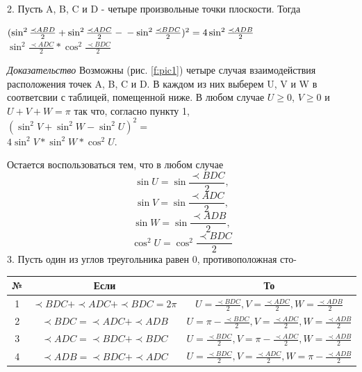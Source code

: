 \newpage

\begin{multicols}{2}
\setcounter{page}{19}
\setcounter{figure}{7}    
\captionsetup{font=footnotesize,
  justification=raggedright,
  singlelinecheck=false,
  labelfont=it}

2. Пусть A, B, C и D - четыре произвольные точки плоскости. Тогда

$(\sin^2{\frac{\prec ABD}{2}} + \sin^2{\frac{\prec ADC}{2}} -\\ - \sin^2{\frac{\prec BDC}{2}})^2 = 4\sin^2{\frac{\prec ADB}{2}}$
\times \\\-\hspace{2cm} \times$\sin^2{\frac{\prec ADC}{2}*\cos^2{\frac{\prec BDC}{2}}}$


\textit{Доказательство}  Возможны (рис. \ref{f:pic1})
четыре случая взаимодействия расположения точек A, B, C и D. В каждом из них выберем U, V и W в соответсвии с таблицей, помещенной ниже. В любом случае $U\geqslant0$, $V\geqslant0$ и $U+V+W=\pi$ так что, согласно пункту 1, \\
$(\sin^2{V}+\sin^2{W}-\sin^2{U})^2=$\\
\-\hspace{2cm}$4\sin^2{V}*\sin^2{W}*\cos^2{U}.$
 
Остается воспользоваться тем, что в любом случае\\
$$\sin{U}=\sin{\frac{\prec BDC}{2}},$$
$$\sin{V}=\sin{\frac{\prec ADC}{2}},$$
$$\sin{W}=\sin{\frac{\prec ADB}{2}},$$
$$\cos^2{U}=\cos^2{\frac{\prec BDC}{2}}$$
3. Пусть один из углов треугольника равен 0, противоположная сто-

\vspace*{5mm}

\begin{bottom*}
  \centering
  \renewcommand{\arraystretch}{2}
  \begin{tabular}{|c|c|c|}
  \hline
  № & Если & То\\ 
  \hline 
    1 & $\prec BDC+\prec ADC+\prec BDC=2\pi$ & $U=\frac{\prec BDC}{2}, V=\frac{\prec ADC}{2}, W=\frac{\prec ADB}{2}$ \\ 
    \hline
    2 & $\prec BDC=\prec ADC+\prec ADB$ & $U=\pi-\frac{\prec BDC}{2}, V=\frac{\prec ADC}{2}, W=\frac{\prec ADB}{2}$\\
    \hline
    3 & $\prec ADC=\prec BDC+\prec BDC$ & $U=\frac{\prec BDC}{2}, V=\pi-\frac{\prec ADC}{2}, W=\frac{\prec ADB}{2}$\\
    \hline
    4 & $\prec ADB=\prec BDC+\prec ADC$ & $U=\frac{\prec BDC}{2}, V=\frac{\prec ADC}{2}, W=\pi-\frac{\prec ADB}{2}$ \\
    \hline
  \end{tabular}
\end{bottom*}



\end{multicols}
